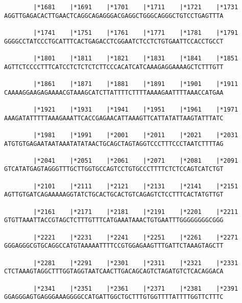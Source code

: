 \documentclass{article}
\begin{document}
\begin{Verbatim}
        |*1681    |*1691    |*1701    |*1711    |*1721    |*1731
AGGTTGAGACACTTGAACTCAGGCAGAGGGACGAGGCTGGGCAGGGCTGTCCTGAGTTTA
                                                            
        |*1741    |*1751    |*1761    |*1771    |*1781    |*1791
GGGGCCTATCCCTGCATTTCACTGAGACCTCGGAATCTCCTCTGTGAATTCCACCTGCCT
                                                            
        |*1801    |*1811    |*1821    |*1831    |*1841    |*1851
AGTTCTCCCCTTTCATCCTCTCTCTCTTCCCACATCATCAAAGAGGAAAAGCTCTTTGTT
                                                            
        |*1861    |*1871    |*1881    |*1891    |*1901    |*1911
CAAAAGGAAGAGAAAACGTAAAGCATCTTATTTTCTTTTAAAAGAATTTTAAACCATGAA
                                                            
        |*1921    |*1931    |*1941    |*1951    |*1961    |*1971
AAAGATATTTTTAAAGAAATTCACCGAGAACATTAAAGTTCATTATATTAAGTATTTATC
                                                            
        |*1981    |*1991    |*2001    |*2011    |*2021    |*2031
ATGTGTGAGAATAATAAATATATAACTGCAGCTAGTAGGTCCCTTTCCCTAATCTTTTAG
                                                            
        |*2041    |*2051    |*2061    |*2071    |*2081    |*2091
GTCATATGAGTAGGGTTTGCTTGGTGCCAGTCCTGTGCCCTTTTCTCTCCAGTCATCTGT
                                                            
        |*2101    |*2111    |*2121    |*2131    |*2141    |*2151
AGTTGTGATCAGAAAAAGGTATCTGCACTGCACTGTCAGAGTCTCCTTTCACTATGTTGT
                                                            
        |*2161    |*2171    |*2181    |*2191    |*2201    |*2211
GTGTTAAATTACCGTAGCTCTTTGTTTCATGAAATAAACTGTGAATTTGGGGGGGGCGGG
                                                            
        |*2221    |*2231    |*2241    |*2251    |*2261    |*2271
GGGAGGGCGTGCAGGCCATGTAAAAATTTTCCGTGGAGAAGTTTGATTCTAAAGTAGCTT
                                                            
        |*2281    |*2291    |*2301    |*2311    |*2321    |*2331
CTCTAAAGTAGGCTTTGGTAGGTAATCAACTTGACAGCAGTCTAGATGTCTCACAGGACA
                                                            
        |*2341    |*2351    |*2361    |*2371    |*2381    |*2391
GGAGGGAGTGAGGGAAAGGGGCCATGATTGGCTGCTTTGTGGTTTTATTTTGGTTCTTTC
                                                            

\end{Verbatim}
\end{document}
